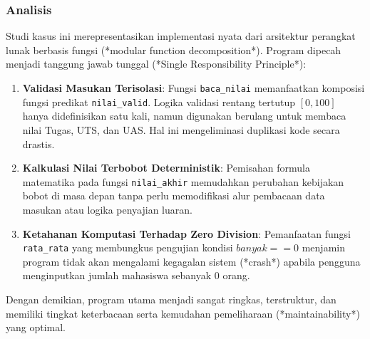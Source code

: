 \documentclass[12pt,a4paper]{article}
\begin{document}
\subsubsection{Analisis}
Studi kasus ini merepresentasikan implementasi nyata dari arsitektur perangkat lunak berbasis fungsi (*modular function decomposition*). Program dipecah menjadi tanggung jawab tunggal (*Single Responsibility Principle*):
\begin{enumerate}
    \item \textbf{Validasi Masukan Terisolasi}: Fungsi \texttt{baca\_nilai} memanfaatkan komposisi fungsi predikat \texttt{nilai\_valid}. Logika validasi rentang tertutup $[0, 100]$ hanya didefinisikan satu kali, namun digunakan berulang untuk membaca nilai Tugas, UTS, dan UAS. Hal ini mengeliminasi duplikasi kode secara drastis.
    \item \textbf{Kalkulasi Nilai Terbobot Deterministik}: Pemisahan formula matematika pada fungsi \texttt{nilai\_akhir} memudahkan perubahan kebijakan bobot di masa depan tanpa perlu memodifikasi alur pembacaan data masukan atau logika penyajian luaran.
    \item \textbf{Ketahanan Komputasi Terhadap Zero Division}: Pemanfaatan fungsi \texttt{rata\_rata} yang membungkus pengujian kondisi $banyak == 0$ menjamin program tidak akan mengalami kegagalan sistem (*crash*) apabila pengguna menginputkan jumlah mahasiswa sebanyak 0 orang.
\end{enumerate}
Dengan demikian, program utama menjadi sangat ringkas, terstruktur, dan memiliki tingkat keterbacaan serta kemudahan pemeliharaan (*maintainability*) yang optimal.

\end{document}
